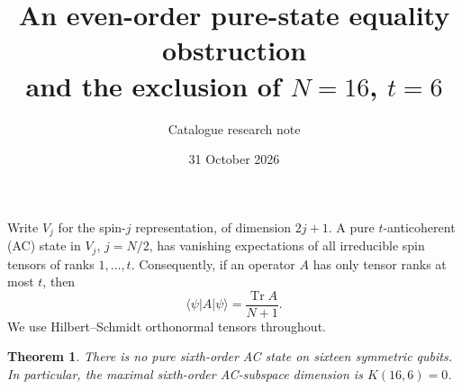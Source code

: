 \documentclass[11pt]{article}
\newtheorem{theorem}{Theorem}
\newcommand{\Tr}{\operatorname{Tr}}
\begin{document}
\title{An even-order pure-state equality obstruction\\and the exclusion of $N=16$, $t=6$}
\author{Catalogue research note}
\date{31 October 2026}
\maketitle

Write $V_j$ for the spin-$j$ representation, of dimension $2j+1$.
A pure $t$-anticoherent (AC) state in $V_j$, $j=N/2$, has vanishing
expectations of all irreducible spin tensors of ranks $1,\ldots,t$.
Consequently, if an operator $A$ has only tensor ranks at most $t$, then
\[
 \langle\psi|A|\psi\rangle=\frac{\Tr A}{N+1}.
\]
We use Hilbert--Schmidt orthonormal tensors throughout.

\begin{theorem}
There is no pure sixth-order AC state on sixteen symmetric qubits.
In particular, the maximal sixth-order AC-subspace dimension is
$K(16,6)=0$.
\end{theorem}
\end{document}
